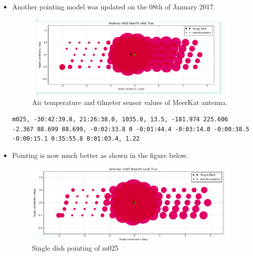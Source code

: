 \documentclass{article}
\begin{document}
{\begin{appendices}
\begin{itemize}
\begin{figure}[H]
	\caption{Air temperature and tilmeter sensor values of MeerKat antenna.}
	\label{fig:tilt1}
\end{figure}








\item  Another pointing model was updated on the 08th of January 2017.
\begin{figure}[H]
	\centering
	\includegraphics[scale=0.33]{m025_better_after.png}
	
	\caption{Air temperature and tilmeter sensor values of MeerKat antenna.}
	\label{fig:tilt5}
\end{figure}
\begin{lstlisting}
m025, -30:42:39.8, 21:26:38.0, 1035.0, 13.5, -181.974 225.606 -2.367 88.699 88.699, -0:02:33.8 0 -0:01:44.4 -0:03:14.0 -0:00:38.5 -0:00:15.1 0:35:55.8 0:01:03.4, 1.22
\end{lstlisting}


\item Pointing is now much better as shown in the figure below. 

\begin{figure}[H]
	\centering
	\includegraphics[scale=0.43]{m025AnotherPointing.png}
	
	\caption{Single dish pointing of m025}
	\label{fig:tilt1}
\end{figure}



\end{itemize}
\end{appendices}}
\end{document}

